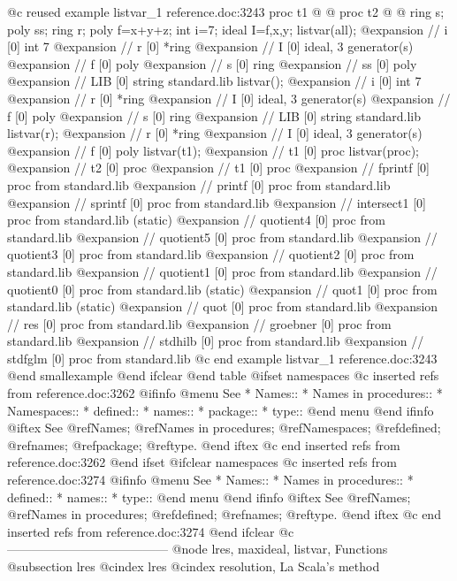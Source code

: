 {@c reused example listvar_1 reference.doc:3243 
  proc t1 @{ @}
  proc t2 @{ @}
  ring s;
  poly ss;
  ring r;
  poly f=x+y+z;
  int i=7;
  ideal I=f,x,y;
  listvar(all);
@expansion{} // i                    [0]  int 7
@expansion{} // r                    [0]  *ring
@expansion{} //      I                    [0]  ideal, 3 generator(s)
@expansion{} //      f                    [0]  poly
@expansion{} // s                    [0]  ring
@expansion{} //      ss                   [0]  poly
@expansion{} // LIB                  [0]  string standard.lib
  listvar();
@expansion{} // i                    [0]  int 7
@expansion{} // r                    [0]  *ring
@expansion{} //      I                    [0]  ideal, 3 generator(s)
@expansion{} //      f                    [0]  poly
@expansion{} // s                    [0]  ring
@expansion{} // LIB                  [0]  string standard.lib
  listvar(r);
@expansion{} // r                    [0]  *ring
@expansion{} // I                    [0]  ideal, 3 generator(s)
@expansion{} // f                    [0]  poly
  listvar(t1);
@expansion{} // t1                   [0]  proc
  listvar(proc);
@expansion{} // t2                   [0]  proc
@expansion{} // t1                   [0]  proc
@expansion{} // fprintf              [0]  proc from standard.lib
@expansion{} // printf               [0]  proc from standard.lib
@expansion{} // sprintf              [0]  proc from standard.lib
@expansion{} // intersect1           [0]  proc from standard.lib (static)
@expansion{} // quotient4            [0]  proc from standard.lib
@expansion{} // quotient5            [0]  proc from standard.lib
@expansion{} // quotient3            [0]  proc from standard.lib
@expansion{} // quotient2            [0]  proc from standard.lib
@expansion{} // quotient1            [0]  proc from standard.lib
@expansion{} // quotient0            [0]  proc from standard.lib (static)
@expansion{} // quot1                [0]  proc from standard.lib (static)
@expansion{} // quot                 [0]  proc from standard.lib
@expansion{} // res                  [0]  proc from standard.lib
@expansion{} // groebner             [0]  proc from standard.lib
@expansion{} // stdhilb              [0]  proc from standard.lib
@expansion{} // stdfglm              [0]  proc from standard.lib
@c end example listvar_1 reference.doc:3243
@end smallexample
@end ifclear
@end table
@ifset namespaces
@c inserted refs from reference.doc:3262
@ifinfo
@menu
See
* Names::
* Names in procedures::
* Namespaces::
* defined::
* names::
* package::
* type::
@end menu
@end ifinfo
@iftex
See
@ref{Names};
@ref{Names in procedures};
@ref{Namespaces};
@ref{defined};
@ref{names};
@ref{package};
@ref{type}.
@end iftex
@c end inserted refs from reference.doc:3262
@end ifset
@ifclear namespaces
@c inserted refs from reference.doc:3274
@ifinfo
@menu
See
* Names::
* Names in procedures::
* defined::
* names::
* type::
@end menu
@end ifinfo
@iftex
See
@ref{Names};
@ref{Names in procedures};
@ref{defined};
@ref{names};
@ref{type}.
@end iftex
@c end inserted refs from reference.doc:3274
@end ifclear
@c ---------------------------------------
@node lres, maxideal, listvar, Functions
@subsection lres
@cindex lres
@cindex resolution, La Scala's method

}
